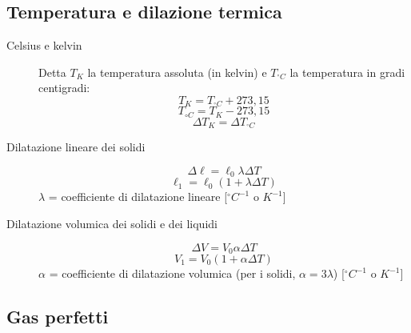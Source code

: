 \documentclass[a4paper,11pt,italian]{article}
\begin{document}
\subsection{Temperatura e dilazione termica}

\begin{description}
  \item[Celsius e kelvin]
  Detta $ T_K $ la temperatura assoluta (in kelvin) e $ T_{^{\circ}C} $ la temperatura in gradi centigradi:
  \[ T_K = T_{^{\circ}C} + 273,15 \]
  \[ T_{{\circ}C} = T_{K} - 273,15 \]
  \[ \Delta T_K = \Delta T_{^{\circ}C} \]
  
  \item[Dilatazione lineare dei solidi] 
  \[ \Delta \ell = \ell_0 \lambda \Delta T \] 
  \[ \ell_1 = \ell_0 (1 + \lambda \Delta T) \]
  $ \lambda $ = coefficiente di dilatazione lineare [$ ^{\circ}C^{-1} $ o $ K^{-1} $]
  
  \item[Dilatazione volumica dei solidi e dei liquidi] 
  \[ \Delta V = V_0 \alpha \Delta T \] 
  \[ V_1 = V_0 (1 + \alpha \Delta T) \]
  $ \alpha $ = coefficiente di dilatazione volumica (per i solidi, $ \alpha = 3 \lambda $) [$ ^{\circ}C^{-1} $ o $ K^{-1} $]
\end{description}

\subsection{Gas perfetti}
\end{document}
